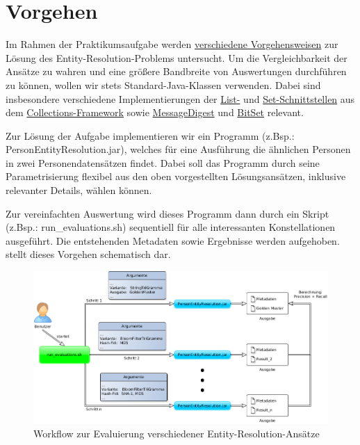 \section{Vorgehen}
\label{sec:design}

Im Rahmen der Praktikumsaufgabe werden \hyperref[sec:approaches]{verschiedene Vorgehensweisen}
zur Lösung des Entity-Resolution-Problems untersucht.
Um die Vergleichbarkeit der Ansätze zu wahren und eine größere Bandbreite von Auswertungen durchführen zu können,
wollen wir stets Standard-Java-Klassen verwenden.
Dabei sind insbesondere verschiedene Implementierungen der
\href{https://docs.oracle.com/javase/7/docs/api/java/util/List.html}{List-} und
\href{https://docs.oracle.com/javase/7/docs/api/java/util/Set.html}{Set-Schnittstellen} aus dem
\href{http://docs.oracle.com/javase/7/docs/technotes/guides/collections/overview.html}{Collections-Framework}
sowie \href{https://docs.oracle.com/javase/7/docs/api/java/security/MessageDigest.html}{MessageDigest}
und \href{https://docs.oracle.com/javase/7/docs/api/java/util/BitSet.html}{BitSet} relevant.

Zur Lösung der Aufgabe implementieren wir ein Programm (z.Bsp.: PersonEntityResolution.jar), welches für eine Ausführung
die ähnlichen Personen in zwei Personendatensätzen findet.
Dabei soll das Programm durch seine Parametrisierung flexibel aus den oben vorgestellten Lösungsansätzen, inklusive relevanter Details,
wählen können.

Zur vereinfachten Auswertung wird dieses Programm dann durch ein Skript (z.Bsp.: run\_evaluations.sh)
sequentiell für alle interessanten Konstellationen ausgeführt.
Die entstehenden Metadaten sowie Ergebnisse werden aufgehoben.
 stellt dieses Vorgehen schematisch dar.

\begin{figure}[h]
	\includegraphics[width=1.01 \textwidth]{evaluation_sketch.png}
	\caption{Workflow zur Evaluierung verschiedener Entity-Resolution-Ansätze}
	\label{fig:workflow}
\end{figure}

